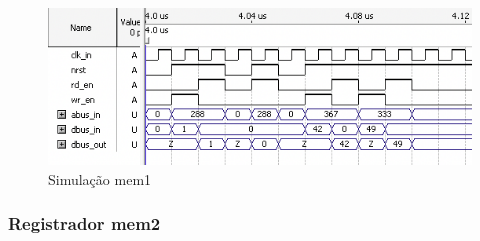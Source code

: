 \documentclass{article}
\begin{document}
\begin{figure}[ht]
    \begin{center}
            \includegraphics[width=15cm]{images/ram-mem1.png}
            \caption{Simulação mem1}
    \end{center}
    \end{figure}

\subsubsection{Registrador mem2}
\end{document}
